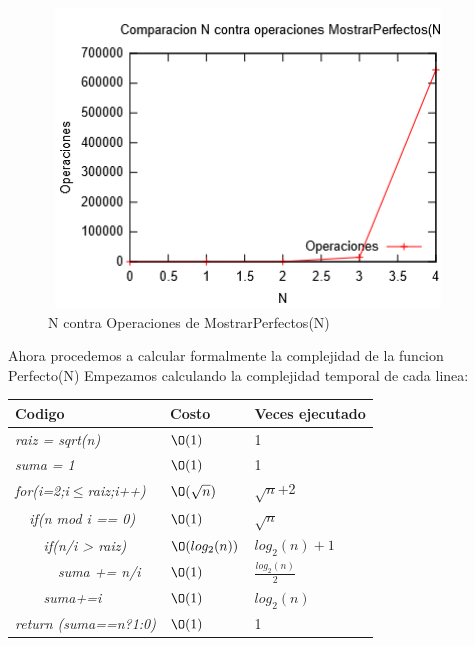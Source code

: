 \documentclass[spanish]{article}
\begin{document}
			\begin{figure}[H]
				\centering
				\includegraphics[width=400px,height=300px]{grafica4}
				\caption{N contra Operaciones de MostrarPerfectos(N)}
			\end{figure}
			Ahora procedemos a calcular formalmente la complejidad de la funcion Perfecto(N)
			Empezamos calculando la complejidad temporal de cada linea:
			\begin{center}
				\begin{table}[H]
					\begin{tabular}{|l|l|l|}
						\hline
						\rowcolor[HTML]{FFCC67} 
						Codigo                           & Costo & Veces ejecutado \\ \hline
						\textit{raiz = sqrt(n)}                    & $\O(1)$    & 1               \\ \hline
						\textit{suma = 1}                    & $\O(1)$    & 1               \\ \hline
						\textit{for(i=2;i$\leq$raiz;i++)} & $\O(\sqrt{n})$    & $\sqrt{n}$+2             \\ \hline
						\textit{\  \  if(n mod i == 0)}                 & $\O(1)$    & $\sqrt{n}$               \\ \hline
						\textit{\  \  \  \  if(n/i > raiz)}                     & $\O(log_2(n))$    & $log_2(n)+1$              \\ \hline
						\textit{\  \  \  \  \  \  suma += n/i}                     & $\O(1)$    & $\frac{log_2(n)}{2}$               \\ \hline
						\textit{\  \  \  \  suma+=i}                     & $\O(1)$    & $log_2(n)$               \\ \hline
						\textit{return (suma==n?1:0)}                & $\O(1)$    & 1               \\ \hline
					\end{tabular}
				\end{table}										
			\end{center}			
\end{document}
